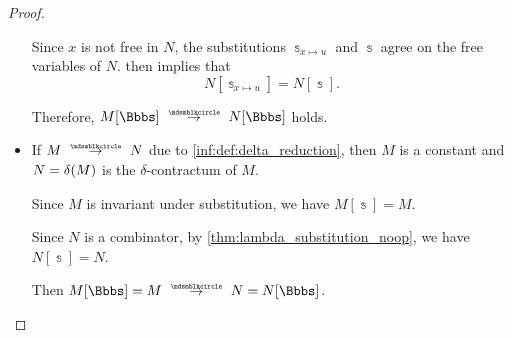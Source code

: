 \begin{proof}
\begin{itemize}
    Since \( x \) is not free in \( N \), the substitutions \( \Bbbs_{x \mapsto u} \) and \( \Bbbs \) agree on the free variables of \( N \).  then implies that
    \begin{equation*}
      N[\Bbbs_{x \mapsto u}] = N[\Bbbs].
    \end{equation*}

    Therefore, \( M[\Bbbs] \pred N[\Bbbs] \) holds.

    \item If \( M \pred N \) due to \ref{inf:def:delta_reduction}, then \( M \) is a constant and \( N = \op*{\delta}(M) \) is the \( \delta \)-contractum of \( M \).

    Since \( M \) is invariant under substitution, we have \( M[\Bbbs] = M \).

    Since \( N \) is a combinator, by \cref{thm:lambda_substitution_noop}, we have \( N[\Bbbs] = N \).

    Then \( M[\Bbbs] = M \pred N = N[\Bbbs] \).
  \end{itemize}
\end{proof}
